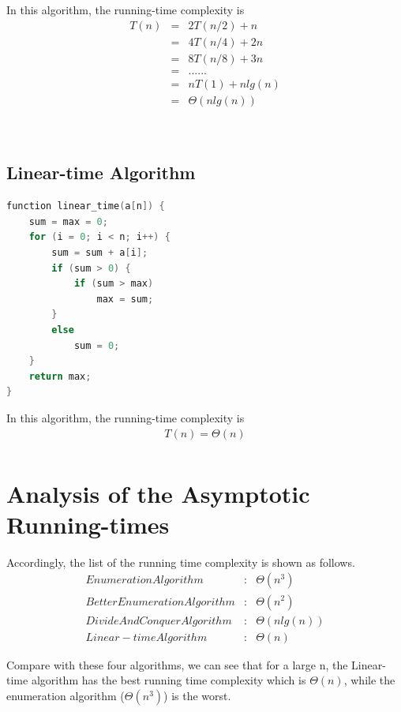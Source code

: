 \documentclass[11pt]{scrreprt}
\begin{document}
In this algorithm, the running-time complexity is
\begin{eqnarray*}
T(n) 	& = & 2T(n/2)+n\\
		& = & 4T(n/4)+2n\\
		& = & 8T(n/8)+3n\\
		& = & ......\\
		& = & nT(1)+nlg(n)\\
		& = & \Theta(nlg(n))\\\\\\\\\\\\
\end{eqnarray*}

\subsection{Linear-time Algorithm}

\begin{lstlisting}[language=c]
function linear_time(a[n]) {
	sum = max = 0;
	for (i = 0; i < n; i++) {
		sum = sum + a[i];
		if (sum > 0) {
			if (sum > max)
				max = sum;
		}
		else
			sum = 0;
	}
	return max;
}
\end{lstlisting}

In this algorithm, the running-time complexity is
\begin{eqnarray*}
T(n) = \Theta(n)\\
\end{eqnarray*}

\section{Analysis of the Asymptotic Running-times}

Accordingly, the list of the running time complexity is shown as follows.
\begin{eqnarray*}
Enumeration Algorithm&:& \Theta(n^3)\\
Better Enumeration Algorithm&:& \Theta(n^2)\\
Divide And Conquer Algorithm&:& \Theta(nlg(n))\\
Linear-time Algorithm&:& \Theta(n)
\end{eqnarray*}

Compare with these four algorithms, we can see that for a large n, the Linear-time algorithm has the best running time complexity which is $\Theta(n)$, while the enumeration algorithm ($\Theta(n^3)$) is the worst.
\end{document}
